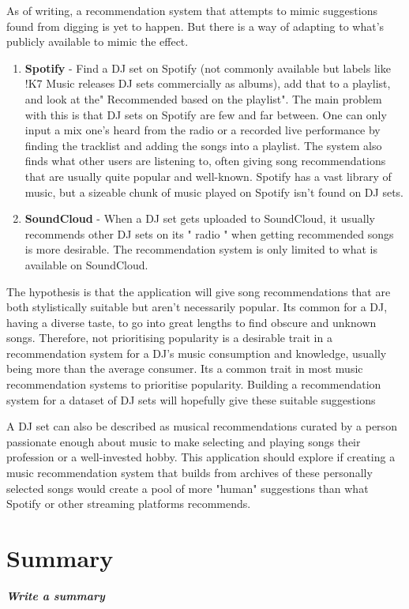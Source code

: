 As of writing, a recommendation system that attempts to mimic suggestions found from digging is yet to happen. But there is a way of adapting to what's publicly available to mimic the effect.

\begin{enumerate}
	\item \textbf{Spotify }- Find a DJ set on Spotify (not commonly available but labels like !K7 Music
	releases DJ sets commercially as albums), add that to a playlist, and look at the"
	Recommended based on the playlist". The main problem with this is that DJ sets on
	Spotify are few and far between. One can only input a mix one’s heard from the radio or
	a recorded live performance by finding the tracklist and adding the songs into a playlist.
	The system also finds what other users are listening to, often giving song recommendations
	that are usually quite popular and well-known. Spotify has a vast library of music, but a
	sizeable chunk of music played on Spotify isn’t found on DJ sets.
	
	\item \textbf{SoundCloud }- When a DJ set gets uploaded to SoundCloud, it usually recommends other DJ sets on its " radio " when getting recommended songs is more desirable. The recommendation system is only limited to what is available on SoundCloud.
	
\end{enumerate}
	
The hypothesis is that the application will give song recommendations that are both stylistically
suitable but aren’t necessarily popular. Its common for a DJ, having a diverse taste, to go into
great lengths to find obscure and unknown songs. Therefore, not prioritising popularity is a
desirable trait in a recommendation system for a DJ’s music consumption and knowledge, usually
being more than the average consumer. Its a common trait in most music recommendation
systems to prioritise popularity. Building a recommendation system for a dataset of DJ sets
will hopefully give these suitable suggestions	

A DJ set can also be described as musical recommendations curated by a person passionate
enough about music to make selecting and playing songs their profession or a well-invested
hobby. This application should explore if creating a music recommendation system that builds
from archives of these personally selected songs would create a pool of more "human"
suggestions than what Spotify or other streaming platforms recommends.

\section{Summary}
\textbf{\textit{Write a summary}}



